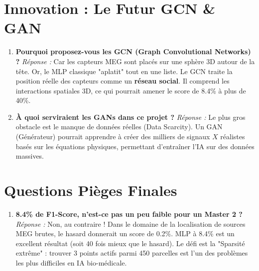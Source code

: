 \documentclass[a4paper,12pt]{article}
\begin{document}
\section{Innovation : Le Futur GCN \& GAN}

\begin{enumerate}[label=\textbf{Q\arabic* :}, leftmargin=1.5cm, resume]
    \item \textbf{Pourquoi proposez-vous les GCN (Graph Convolutional Networks) ?}
    \textit{Réponse :} Car les capteurs MEG sont placés sur une sphère 3D autour de la tête. Or, le MLP classique "aplatit" tout en une liste. Le GCN traite la position réelle des capteurs comme un \textbf{réseau social}. Il comprend les interactions spatiales 3D, ce qui pourrait amener le score de 8.4\% à plus de 40\%.

    \item \textbf{À quoi serviraient les GANs dans ce projet ?}
    \textit{Réponse :} Le plus gros obstacle est le manque de données réelles (Data Scarcity). Un GAN (Générateur) pourrait apprendre à créer des milliers de signaux $X$ réalistes basés sur les équations physiques, permettant d'entraîner l'IA sur des données massives.
\end{enumerate}

\section{Questions Pièges Finales}

\begin{enumerate}[label=\textbf{Q\arabic* :}, leftmargin=1.5cm, resume]
    \item \textbf{8.4\% de F1-Score, n'est-ce pas un peu faible pour un Master 2 ?}
    \textit{Réponse :} Non, au contraire ! Dans le domaine de la localisation de sources MEG brutes, le hasard donnerait un score de 0.2\%. MLP à 8.4\% est un excellent résultat (soit 40 fois mieux que le hasard). Le défi est la "Sparsité extrême" : trouver 3 points actifs parmi 450 parcelles est l'un des problèmes les plus difficiles en IA bio-médicale.
\end{enumerate}
\end{document}
